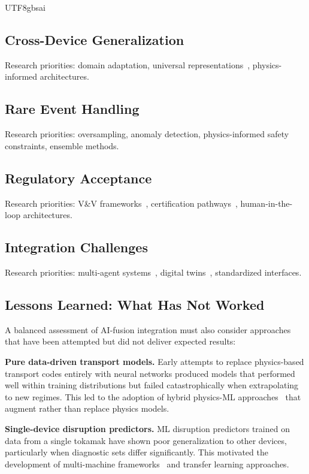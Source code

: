 \documentclass[12pt,a4paper]{article}
\begin{document}
\begin{CJK}{UTF8}{gbsai}
\subsection{Cross-Device Generalization}

Research priorities: domain adaptation, universal representations~\citep{Davies2025}, physics-informed architectures.

\subsection{Rare Event Handling}

Research priorities: oversampling, anomaly detection, physics-informed safety constraints, ensemble methods.

\subsection{Regulatory Acceptance}

Research priorities: V\&V frameworks~\citep{Bozhenkov2024}, certification pathways~\citep{Schissel2025}, human-in-the-loop architectures.

\subsection{Integration Challenges}

Research priorities: multi-agent systems~\citep{Char2024FEC}, digital twins~\citep{Chen2024DT}, standardized interfaces.

\subsection{Lessons Learned: What Has Not Worked}

A balanced assessment of AI-fusion integration must also consider approaches that have been attempted but did not deliver expected results:

\textbf{Pure data-driven transport models.} Early attempts to replace physics-based transport codes entirely with neural networks produced models that performed well within training distributions but failed catastrophically when extrapolating to new regimes. This led to the adoption of hybrid physics-ML approaches~\citep{Meneghini2024OMFIT} that augment rather than replace physics models.

\textbf{Single-device disruption predictors.} ML disruption predictors trained on data from a single tokamak have shown poor generalization to other devices, particularly when diagnostic sets differ significantly. This motivated the development of multi-machine frameworks~\citep{KatesHarbeck2019,Rea2018} and transfer learning approaches.


\end{CJK}
\end{document}
